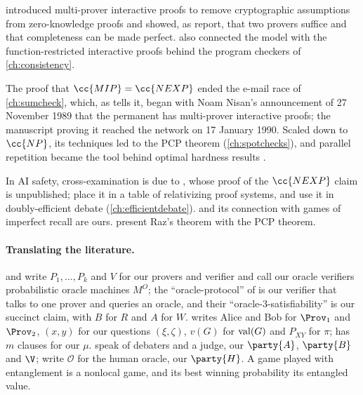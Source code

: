 \begin{refsection}
\notesandrefs
\Textcite{BenOrEtAl1988} introduced multi-prover interactive proofs to remove cryptographic assumptions from zero-knowledge proofs and showed, as \textcite{FortnowRompelSipser1994} report, that two provers suffice and that completeness can be made perfect. \Textcite{FortnowRompelSipser1994} also connected the model with the function-restricted interactive proofs behind the program checkers of \cref{ch:consistency}.

The proof that $\cc{MIP}=\cc{NEXP}$ ended the e-mail race of \cref{ch:sumcheck}, which, as \textcite{Babai1990} tells it, began with Noam Nisan's announcement of 27 November 1989 that the permanent has multi-prover interactive proofs; the manuscript proving it reached the network on 17 January 1990. Scaled down to $\cc{NP}$, its techniques led to the PCP theorem (\cref{ch:spotchecks}), and parallel repetition \parencite{Raz1998} became the tool behind optimal hardness results \parencite{Hastad2001}.

In AI safety, cross-examination is due to \textcite{BarnesChristiano2020}, whose proof of the $\cc{NEXP}$ claim is unpublished; \textcite{IrvingMarshall2025} place it in a table of relativizing proof systems, and \textcite{BrownCohenEtAl2024} use it in doubly-efficient debate (\cref{ch:efficientdebate}).  and its connection with games of imperfect recall are ours. \Textcite[Chapter~22]{AroraBarak2009} present Raz's theorem with the PCP theorem.

\paragraph{Translating the literature.} \Textcite{FortnowRompelSipser1994} and \textcite{BabaiFortnowLund1991} write $P_1,\dots,P_k$ and $V$ for our provers and verifier and call our oracle verifiers probabilistic oracle machines $M^O$; the ``oracle-protocol'' of \textcite{BabaiFortnowLund1991} is our verifier that talks to one prover and queries an oracle, and their ``oracle-3-satisfiability'' is our succinct claim, with $B$ for $R$ and $A$ for $W$. \Textcite{Holenstein2009} writes Alice and Bob for $\Prov_1$ and $\Prov_2$, $(x,y)$ for our questions $(\xi,\zeta)$, $v(G)$ for $\mathrm{val}(G)$ and $P_{XY}$ for $\pi$; \textcite{Hastad2001} has $m$ clauses for our $\mu$. \Textcite{BarnesChristiano2020} speak of debaters and a judge, our $\party{A}$, $\party{B}$ and $\V$; \textcite{BrownCohenEtAl2024} write $\mathcal{O}$ for the human oracle, our $\party{H}$. A game played with entanglement is a nonlocal game, and its best winning probability its entangled value.

\printchapterbib
\end{refsection}
